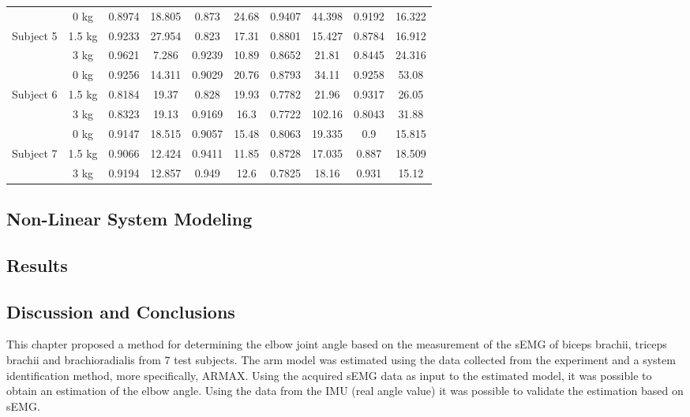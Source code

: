 \begin{table}[h]
\begin{center}
{\begin{tabular}{|c c|c c|c c|c c|c c|}
& 0 kg &0.8974 &18.805 &0.873 &24.68 & 0.9407 & 44.398 & 0.9192 & 16.322\\
Subject 5 & 1.5 kg &0.9233 &27.954 &0.823 &17.31 & 0.8801 & 15.427 & 0.8784 & 16.912\\
& 3 kg & 0.9621&7.286 &0.9239 &10.89& 0.8652 & 21.81 & 0.8445 & 24.316\\
\hline

& 0 kg &0.9256 &14.311 &0.9029 &20.76 & 0.8793 & 34.11 & 0.9258 & 53.08\\
Subject 6 & 1.5 kg &0.8184 &19.37 &0.828 &19.93 & 0.7782 & 21.96 & 0.9317 & 26.05\\
& 3 kg & 0.8323 & 19.13 &0.9169 &16.3 & 0.7722 & 102.16 & 0.8043 & 31.88\\
\hline

& 0 kg &0.9147 &18.515 &0.9057 &15.48 & 0.8063 & 19.335 & 0.9 & 15.815\\
Subject 7 & 1.5 kg &0.9066 & 12.424&0.9411 & 11.85 &0.8728 & 17.035 & 0.887 & 18.509\\
& 3 kg &0.9194 &12.857 &0.949 &12.6 & 0.7825 & 18.16 & 0.931 & 15.12\\
\hline

\end{tabular}%
}
\end{center}

\label{ta:corr}
\end{table}

\subsection{Non-Linear System Modeling}

\subsection{Results}

\subsection{Discussion and Conclusions}

This chapter proposed a method for determining the elbow joint angle based on the measurement of the sEMG of biceps brachii, triceps brachii and brachioradialis from 7 test subjects. The arm model was estimated using the data collected from the experiment and a system identification method, more specifically, ARMAX. Using the acquired sEMG data as input to the estimated model, it was possible to obtain an estimation of the elbow angle. Using the data from the IMU (real angle value) it was possible to validate the estimation based on sEMG.

